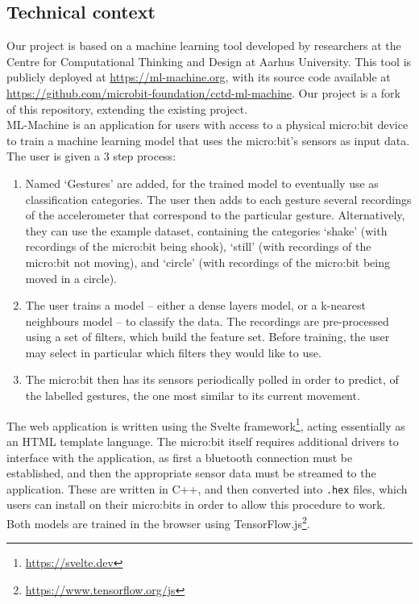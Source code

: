 \documentclass{article}
\begin{document}
\subsection{Technical context}%
\label{subsec:context}

Our project is based on a machine learning tool developed by researchers at the Centre for Computational Thinking and Design at Aarhus University. This tool is publicly deployed at \url{https://ml-machine.org}, with its source code available at \url{https://github.com/microbit-foundation/cctd-ml-machine}. Our project is a fork of this repository, extending the existing project. \\

ML-Machine is an application for users with access to a physical micro:bit device to train a machine learning model that uses the micro:bit's sensors as input data. The user is given a 3 step process:
\begin{enumerate}
        \item Named `Gestures' are added, for the trained model to eventually use as classification categories. The user then adds to each gesture several recordings of the accelerometer that correspond to the particular gesture. Alternatively, they can use the example dataset, containing the categories `shake' (with recordings of the micro:bit being shook), `still' (with recordings of the micro:bit not moving), and `circle' (with recordings of the micro:bit being moved in a circle).
  \item The user trains a model -- either a dense layers model, or a k-nearest neighbours model -- to classify the data. The recordings are pre-processed using a set of filters, which build the feature set. Before training, the user may select in particular which filters they would like to use.
        \item The micro:bit then has its sensors periodically polled in order to predict, of the labelled gestures, the one most similar to its current movement.
\end{enumerate}

The web application is written using the Svelte framework\footnote{\url{https://svelte.dev}}, acting essentially as an HTML template language. The micro:bit itself requires additional drivers to interface with the application, as first a bluetooth connection must be established, and then the appropriate sensor data must be streamed to the application. These are written in C++, and then converted into \verb|.hex| files, which users can install on their micro:bits in order to allow this procedure to work. Both models are trained in the browser using TensorFlow.js\footnote{\url{https://www.tensorflow.org/js}}. \\
\end{document}
